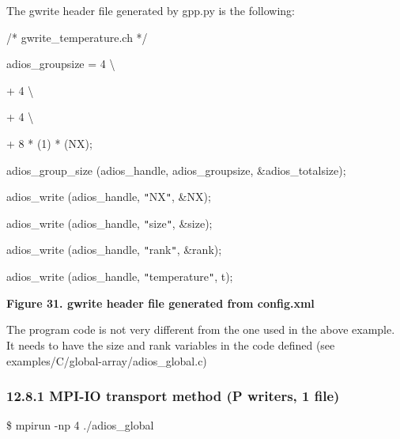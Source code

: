 \vspace{22pt}
The gwrite header file generated by gpp.py is the following:

\vspace{22pt}
/* gwrite\_temperature.ch */

\vspace{10pt}
adios\_groupsize = 4 \textbackslash{}

\vspace{10pt}
\parindent=115pt
+ 4 \textbackslash{}

\vspace{10pt}
+ 4 \textbackslash{}

\vspace{10pt}
\parindent=230pt
+ 8 * (1) * (NX);

\vspace{10pt}
\parindent=0pt
adios\_group\_size (adios\_handle, adios\_groupsize, \&adios\_totalsize);

\vspace{10pt}
adios\_write (adios\_handle, \texttt{"}NX\texttt{"}, \&NX);

\vspace{10pt}
{\color{color02} adios\_write (adios\_handle, \texttt{"}size\texttt{"}, \&size);}

\vspace{10pt}
{\color{color02} adios\_write (adios\_handle, \texttt{"}rank\texttt{"}, \&rank);}

\vspace{10pt}
adios\_write (adios\_handle, \texttt{"}temperature\texttt{"}, t);

\label{HToc144350190}

\vspace{22pt}
\leftskip=18pt
{\color{color20} \textbf{Figure 31. gwrite header file generated from config.xml}}

\vspace{10pt}
\leftskip=0pt
The program code is not very different from the one used in the above example. 
It needs to have the size and rank variables in the code defined (see examples/C/global-array/adios\_global.c) 
\label{HToc182553448}

\vspace{10pt}
\subsubsection*{{\large \textbf{12.8.1 MPI-IO transport method (P writers, 1 file)}}}

\vspace{10pt}
\$ mpirun -np 4 ./adios\_global

